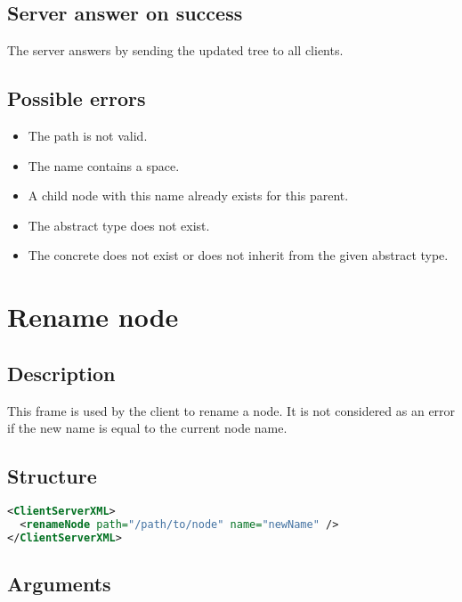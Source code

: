 \subsection{Server answer on success}

The server answers by sending the updated tree  to all
clients.

\subsection{Possible errors}

\begin{itemize}
 \item The path is not valid.
 \item The name contains a space.
 \item A child node with this name already exists for this parent.
 \item The abstract type does not exist.
 \item The concrete does not exist or does not inherit from the given abstract
type.
\end{itemize}


\section{Rename node}
\label{renameNode}

\subsection{Description}

This frame is used by the client to rename a node. It is not considered as an
error if the new name is equal to the current node name.

\subsection{Structure}

\begin{lstlisting}[language=XML]
<ClientServerXML>
  <renameNode path="/path/to/node" name="newName" />
</ClientServerXML>
\end{lstlisting}

\subsection{Arguments}

